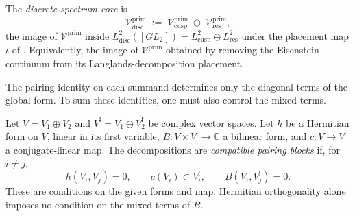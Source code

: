 \begin{definition}
\label{v4-arith:w5-c:def:discrete-core}
The \emph{discrete-spectrum core} is
\begin{equation}
\label{v4-arith:w5-c:eq:discrete-core-def}
\mathcal{V}^{\mathrm{prim}}_{\mathrm{disc}}\;:=\;\mathcal{V}^{\mathrm{prim}}_{\mathrm{cusp}}\;\oplus\;\mathcal{V}^{\mathrm{prim}}_{\mathrm{res}},
\end{equation}
the image of \(\mathcal{V}^{\mathrm{prim}}\) inside
\(L^{2}_{\mathrm{disc}}([GL_{2}])=L^{2}_{\mathrm{cusp}}\oplus L^{2}_{\mathrm{res}}\)
under the placement map
\(\iota\) of .
Equivalently, the image of \(\mathcal{V}^{\mathrm{prim}}\) obtained by
removing the Eisenstein continuum from its Langlands-decomposition
placement.
\end{definition}

The pairing identity on each summand determines only the diagonal
terms of the global form. To sum these identities, one must also
control the mixed terms.

\begin{definition}
\label{v4-arith:w5-c:def:compatible-pairing-blocks}
Let $V=V_1\oplus V_2$ and $V^!=V_1^!\oplus V_2^!$ be complex
vector spaces. Let $h$ be a Hermitian form on $V$, linear in its
first variable, $B:V\times V^!\to\mathbb C$ a bilinear form,
and $c:V\to V^!$ a conjugate-linear map. The decompositions
are \emph{compatible pairing blocks} if, for $i\ne j$,
\[
 h(V_i,V_j)=0,\qquad c(V_i)\subset V_i^!,\qquad
 B(V_i,V_j^!)=0.
\]
These are conditions on the given forms and map. Hermitian
orthogonality alone imposes no condition on the mixed terms of $B$.
\end{definition}

